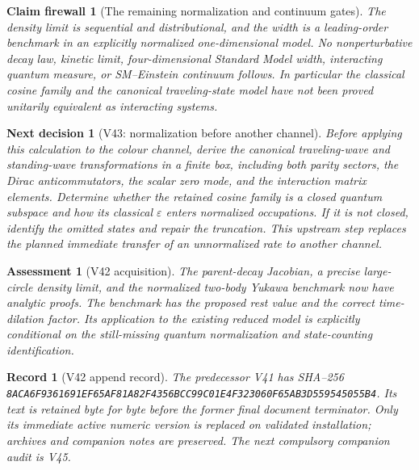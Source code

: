 \documentclass[11pt]{article}
\newtheorem{firewall}[theorem]{Claim firewall}
\newtheorem{decision}[theorem]{Next decision}
\newtheorem{assessment}[theorem]{Assessment}
\newtheorem{record}[theorem]{Record}
\theoremstyle{remark}
\begin{document}
\begin{firewall}[The remaining normalization and continuum gates]
\label{fire:v20v42}
The density limit is sequential and distributional, and the width is
a leading-order benchmark in an explicitly normalized
one-dimensional model.  No nonperturbative decay law, kinetic
limit, four-dimensional Standard Model width, interacting quantum
measure, or SM--Einstein continuum follows.  In particular the
classical cosine family and the canonical traveling-state model
have not been proved unitarily equivalent as interacting systems.
\end{firewall}

\begin{decision}[V43: normalization before another channel]
\label{dec:v20v42-next}
Before applying this calculation to the colour channel, derive the
canonical traveling-wave and standing-wave transformations in a
finite box, including both parity sectors, the Dirac anticommutators,
the scalar zero mode, and the interaction matrix elements.
Determine whether the retained cosine family is a closed quantum
subspace and how its classical \(\varepsilon\) enters normalized
occupations.  If it is not closed, identify the omitted states and
repair the truncation.  This upstream step replaces the planned
immediate transfer of an unnormalized rate to another channel.
\end{decision}

\begin{assessment}[V42 acquisition]
\label{ass:v20v42}
The parent-decay Jacobian, a precise large-circle density limit, and
the normalized two-body Yukawa benchmark now have analytic proofs.
The benchmark has the proposed rest value and the correct
time-dilation factor.  Its application to the existing reduced
model is explicitly conditional on the still-missing quantum
normalization and state-counting identification.
\end{assessment}

\begin{record}[V42 append record]
\label{rec:v20v42}
The predecessor V41 has SHA--256
\texttt{8ACA6F9361691EF65AF81A82F4356BCC99C01E4F323060F65AB3D559545055B4}.
Its text is retained byte for byte before the former final
document terminator.  Only its immediate active numeric version is
replaced on validated installation; archives and companion notes
are preserved.  The next compulsory companion audit is V45.
\end{record}
\end{document}
